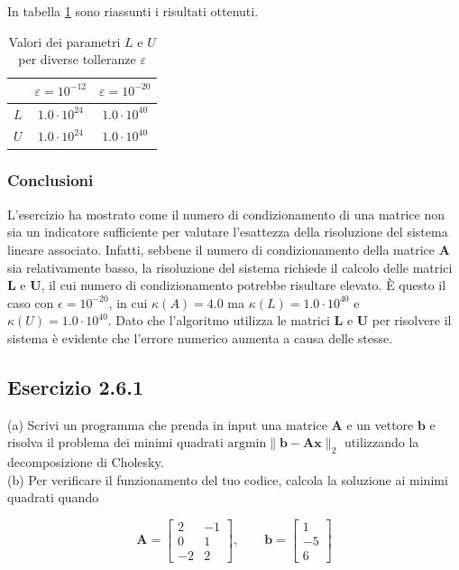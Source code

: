\documentclass[letterpaper, 12pt]{article}
\begin{document}
In tabella \ref{tab:LU_epsilon} sono riassunti i risultati ottenuti.

\begin{table}[!ht]
\centering
\caption{Valori dei parametri \( L \) e \( U \) per diverse tolleranze \( \varepsilon \)}
\label{tab:LU_epsilon}
\begin{tabular}{|c|c|c|}
\hline
 & \( \varepsilon = 10^{-12} \) & \( \varepsilon = 10^{-20} \) \\
\hline
\( L \) & $1.0 \cdot 10^{24}$ & $1.0 \cdot 10^{40}$ \\
\( U \) & $1.0 \cdot 10^{24}$ & $1.0 \cdot 10^{40}$ \\
\hline
\end{tabular}
\end{table}

\subsubsection{Conclusioni}
L'esercizio ha mostrato come il numero di condizionamento di una matrice non sia un indicatore sufficiente per
valutare l'esattezza della risoluzione del sistema lineare associato. Infatti, sebbene il numero di condizionamento
della matrice $\mathbf{A}$ sia relativamente basso, la risoluzione del sistema richiede il calcolo delle matrici
$\mathbf{L}$ e $\mathbf{U}$, il cui numero di condizionamento potrebbe risultare elevato. È questo il caso
con $\epsilon = 10^{-20}$, in cui $\kappa(A) =  4.0$ ma $\kappa(L) = 1.0 \cdot 10^{40}$ e 
$\kappa(U) = 1.0 \cdot 10^{40}$. Dato che l'algoritmo utilizza le matrici $\mathbf{L}$ e $\mathbf{U}$ 
per risolvere il sistema è evidente che l'errore numerico aumenta a causa delle stesse.

\subsection{Esercizio 2.6.1}
(a) Scrivi un programma che prenda in input una matrice $\mathbf{A}$ e un vettore $\mathbf{b}$ e risolva 
il problema dei minimi quadrati $\text{argmin}\| \mathbf{b}- \mathbf{A} \mathbf{x}\|_2$ utilizzando la decomposizione di Cholesky.\\
(b) Per verificare il funzionamento del tuo codice, calcola la soluzione ai minimi quadrati quando
\begin{center}
    \begin{minipage}{0.48\textwidth}
    \centering
    \[
    \mathbf{A} = \begin{bmatrix}
      2 & -1 \\
      0 & 1 \\
      -2 & 2
    \end{bmatrix}, \qquad
    \mathbf{b} = \begin{bmatrix}
      1 \\ -5 \\ 6
    \end{bmatrix}
    \]
    \end{minipage}
\end{center}
\end{document}
